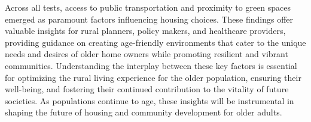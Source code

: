 \documentclass[3p,11pt ]{elsarticle}
\begin{document}
Across all tests, access to public transportation and proximity to green spaces emerged as paramount factors influencing housing choices. These findings offer valuable insights for rural planners, policy makers, and healthcare providers, providing guidance on creating age-friendly environments that cater to the unique needs and desires of older home owners while promoting resilient and vibrant communities. Understanding the interplay between these key factors is essential for optimizing the rural living experience for the older population, ensuring their well-being, and fostering their continued contribution to the vitality of future societies. As populations continue to age, these insights will be instrumental in shaping the future of housing and community development for older adults.

\newpage


\pagebreak




\end{document}
